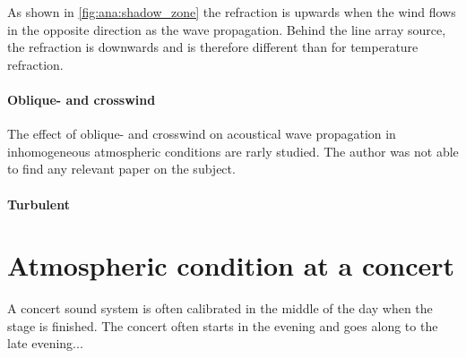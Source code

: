As shown in \autoref{fig:ana:shadow_zone} the refraction is upwards when the wind flows in the opposite direction as the wave propagation. Behind the line array source, the refraction is downwards and is therefore different than for temperature refraction.

\paragraph{Oblique- and crosswind} The effect of oblique- and crosswind on acoustical wave propagation in inhomogeneous atmospheric conditions are rarly studied.  The author was not able to find any relevant paper on the subject.

\paragraph{Turbulent}

 \section{Atmospheric condition at a concert}
A concert sound system is often calibrated in the middle of the day when the stage is finished. The concert often starts in the evening and goes along to the late evening...















